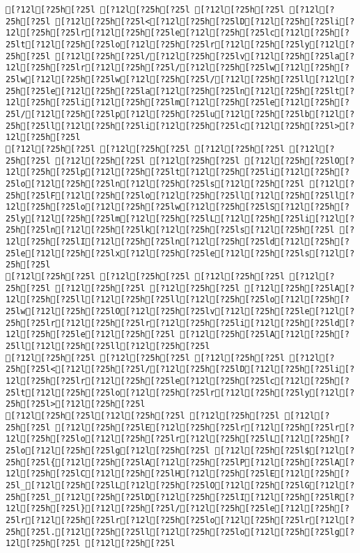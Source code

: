\documentclass{scrartcl}
\begin{document}
\begin{Verbatim}
[?12l[?25h[?25l [?12l[?25h[?25l [?12l[?25h[?25l [?12l[?25h[?25l [?12l[?25h[?25l<[?12l[?25h[?25lD[?12l[?25h[?25li[?12l[?25h[?25lr[?12l[?25h[?25le[?12l[?25h[?25lc[?12l[?25h[?25lt[?12l[?25h[?25lo[?12l[?25h[?25lr[?12l[?25h[?25ly[?12l[?25h[?25l [?12l[?25h[?25l/[?12l[?25h[?25lv[?12l[?25h[?25la[?12l[?25h[?25lr[?12l[?25h[?25l/[?12l[?25h[?25lw[?12l[?25h[?25lw[?12l[?25h[?25lw[?12l[?25h[?25l/[?12l[?25h[?25ll[?12l[?25h[?25le[?12l[?25h[?25la[?12l[?25h[?25ln[?12l[?25h[?25lt[?12l[?25h[?25li[?12l[?25h[?25lm[?12l[?25h[?25le[?12l[?25h[?25l/[?12l[?25h[?25lp[?12l[?25h[?25lu[?12l[?25h[?25lb[?12l[?25h[?25ll[?12l[?25h[?25li[?12l[?25h[?25lc[?12l[?25h[?25l>[?12l[?25h[?25l
[?12l[?25h[?25l [?12l[?25h[?25l [?12l[?25h[?25l [?12l[?25h[?25l [?12l[?25h[?25l [?12l[?25h[?25l [?12l[?25h[?25lO[?12l[?25h[?25lp[?12l[?25h[?25lt[?12l[?25h[?25li[?12l[?25h[?25lo[?12l[?25h[?25ln[?12l[?25h[?25ls[?12l[?25h[?25l [?12l[?25h[?25lF[?12l[?25h[?25lo[?12l[?25h[?25ll[?12l[?25h[?25ll[?12l[?25h[?25lo[?12l[?25h[?25lw[?12l[?25h[?25lS[?12l[?25h[?25ly[?12l[?25h[?25lm[?12l[?25h[?25lL[?12l[?25h[?25li[?12l[?25h[?25ln[?12l[?25h[?25lk[?12l[?25h[?25ls[?12l[?25h[?25l [?12l[?25h[?25lI[?12l[?25h[?25ln[?12l[?25h[?25ld[?12l[?25h[?25le[?12l[?25h[?25lx[?12l[?25h[?25le[?12l[?25h[?25ls[?12l[?25h[?25l
[?12l[?25h[?25l [?12l[?25h[?25l [?12l[?25h[?25l [?12l[?25h[?25l [?12l[?25h[?25l [?12l[?25h[?25l [?12l[?25h[?25lA[?12l[?25h[?25ll[?12l[?25h[?25ll[?12l[?25h[?25lo[?12l[?25h[?25lw[?12l[?25h[?25lO[?12l[?25h[?25lv[?12l[?25h[?25le[?12l[?25h[?25lr[?12l[?25h[?25lr[?12l[?25h[?25li[?12l[?25h[?25ld[?12l[?25h[?25le[?12l[?25h[?25l [?12l[?25h[?25lA[?12l[?25h[?25ll[?12l[?25h[?25ll[?12l[?25h[?25l
[?12l[?25h[?25l [?12l[?25h[?25l [?12l[?25h[?25l [?12l[?25h[?25l<[?12l[?25h[?25l/[?12l[?25h[?25lD[?12l[?25h[?25li[?12l[?25h[?25lr[?12l[?25h[?25le[?12l[?25h[?25lc[?12l[?25h[?25lt[?12l[?25h[?25lo[?12l[?25h[?25lr[?12l[?25h[?25ly[?12l[?25h[?25l>[?12l[?25h[?25l
[?12l[?25h[?25l[?12l[?25h[?25l [?12l[?25h[?25l [?12l[?25h[?25l [?12l[?25h[?25lE[?12l[?25h[?25lr[?12l[?25h[?25lr[?12l[?25h[?25lo[?12l[?25h[?25lr[?12l[?25h[?25lL[?12l[?25h[?25lo[?12l[?25h[?25lg[?12l[?25h[?25l [?12l[?25h[?25l$[?12l[?25h[?25l{[?12l[?25h[?25lA[?12l[?25h[?25lP[?12l[?25h[?25lA[?12l[?25h[?25lC[?12l[?25h[?25lH[?12l[?25h[?25lE[?12l[?25h[?25l_[?12l[?25h[?25lL[?12l[?25h[?25lO[?12l[?25h[?25lG[?12l[?25h[?25l_[?12l[?25h[?25lD[?12l[?25h[?25lI[?12l[?25h[?25lR[?12l[?25h[?25l}[?12l[?25h[?25l/[?12l[?25h[?25le[?12l[?25h[?25lr[?12l[?25h[?25lr[?12l[?25h[?25lo[?12l[?25h[?25lr[?12l[?25h[?25l.[?12l[?25h[?25ll[?12l[?25h[?25lo[?12l[?25h[?25lg[?12l[?25h[?25l [?12l[?25h[?25l

\end{Verbatim}
\end{document}
